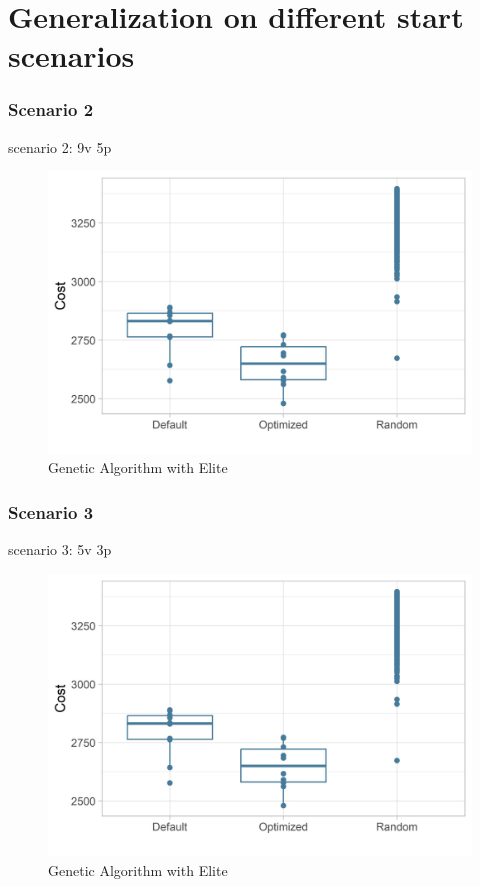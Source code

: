\section{Generalization on different start scenarios}

\subsubsection{Scenario 2}
scenario 2: 9v 5p
\begin{figure}[ht] 
	\label{figure:sim_2_comparison}
	\includegraphics[width=1\linewidth]{simulations/evaluation/plots/sim_1_comparison}
	\caption{Genetic Algorithm with Elite}
\end{figure}


\subsubsection{Scenario 3}
scenario 3: 5v 3p
\begin{figure}[ht] 
	\label{figure:sim_3_comparison}
	\includegraphics[width=1\linewidth]{simulations/evaluation/plots/sim_1_comparison}
	\caption{Genetic Algorithm with Elite}
\end{figure}

